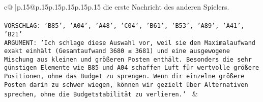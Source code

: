 \documentclass{article}
\begin{document}
{\begin{supertabular}{c@{$\;$}|p{.15\linewidth}@{}p{.15\linewidth}p{.15\linewidth}p{.15\linewidth}p{.15\linewidth}p{.15\linewidth}}
{{{die erste Nachricht des anderen Spielers.\\ \tt \\ \tt VORSCHLAG: {'B85', 'A04', 'A48', 'C04', 'B61', 'B53', 'A89', 'A41', 'B21'}\\ \tt ARGUMENT: {'Ich schlage diese Auswahl vor, weil sie den Maximalaufwand exakt einhält (Gesamtaufwand 3680 ≤ 3681) und eine ausgewogene Mischung aus kleinen und größeren Posten enthält. Besonders die sehr günstigen Elemente wie B85 und A04 schaffen Luft für wertvolle größere Positionen, ohne das Budget zu sprengen. Wenn dir einzelne größere Posten darin zu schwer wiegen, können wir gezielt über Alternativen sprechen, ohne die Budgetstabilität zu verlieren.'} 
	  } 
	   } 
	   } 
	 & \\ 
 

    \theutterance {}  


\end{supertabular}}
\end{document}
